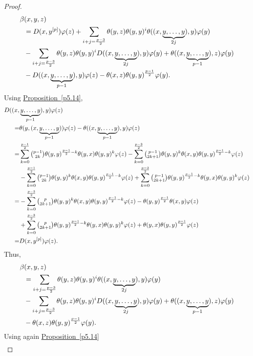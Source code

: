 \documentclass[11pt, twoside]{article}
\begin{document}
\begin{proof}
\begin{align}
        \beta&(x,y,z) \notag \\ &= D(x,y^{[p]})\varphi(z)+ \sum\limits_{i+j=\frac{p-3}{2}}\theta(y,z)\theta(y,y)^i\theta((x,\underbrace{y,\ldots,y}_{2j}),y)\varphi(y) \notag \\ &- \sum\limits_{i+j=\frac{p-3}{2}}\theta(y,z)\theta(y,y)^iD((x,\underbrace{y,\ldots,y}_{2j}),y)\varphi(y) + \theta((x,\underbrace{y,\ldots,y}_{p-1}),z)\varphi(y) \notag\\ &-D((x,\underbrace{y,\ldots,y}_{p-1}),y)\varphi(z) -\theta(x,z)\theta(y,y)^\frac{p-1}{2}\varphi(y) \notag.
    \end{align} Using \hyperref[p5.14]{Proposition~\ref*{p5.14}}, \begin{align*}
        D((x,&\underbrace{y,\ldots,y}_{p-1}),y)\varphi(z)\\ =& \theta(y,(x,\underbrace{y,\ldots,y}_{p-1}))\varphi(z)-\theta((x,\underbrace{y,\ldots,y}_{p-1}),y)\varphi(z)\\ =& \sum\limits_{k=0}^\frac{p-1}{2}\tbinom{p-1}{2k}\theta(y,y)^{\frac{p-1}{2}-k}\theta(y,x)\theta(y,y)^{k}\varphi(z) - \sum\limits_{k=0}^\frac{p-3}{2}\tbinom{p-1}{2k+1}\theta(y,y)^k\theta(x,y)\theta(y,y)^{\frac{p-1}{2}-k}\varphi(z)\\ & -\sum\limits_{k=0}^\frac{p-1}{2}\tbinom{p-1}{2k}\theta(y,y)^k\theta(x,y)\theta(y,y)^{\frac{p-1}{2}-k}\varphi(z)+\sum\limits_{k=0}^\frac{p-3}{2}\tbinom{p-1}{2k+1}\theta(y,y)^{\frac{p-1}{2}-k}\theta(y,x)\theta(y,y)^k\varphi(z)\\ =& -\sum\limits_{k=0}^\frac{p-3}{2}\tbinom{p}{2k+1}\theta(y,y)^k\theta(x,y)\theta(y,y)^{\frac{p-1}{2}-k}\varphi(z) -\theta(y,y)^\frac{p-1}{2}\theta(x,y)\varphi(z) \\ &+ \sum\limits_{k=0}^\frac{p-3}{2}\tbinom{p}{2k+1}\theta(y,y)^{\frac{p-1}{2}-k}\theta(y,x)\theta(y,y)^k\varphi(z)+ \theta(y,x)\theta(y,y)^\frac{p-1}{2}\varphi(z) \\ =& D(x,y^{[p]})\varphi(z).
    \end{align*} Thus, \begin{align}
        \beta&(x,y,z) \notag \\ &=  \sum\limits_{i+j=\frac{p-3}{2}}\theta(y,z)\theta(y,y)^i\theta((x,\underbrace{y,\ldots,y}_{2j}),y)\varphi(y) \notag \\ &- \sum\limits_{i+j=\frac{p-3}{2}}\theta(y,z)\theta(y,y)^iD((x,\underbrace{y,\ldots,y}_{2j}),y)\varphi(y) + \theta((x,\underbrace{y,\ldots,y}_{p-1}),z)\varphi(y) \notag\\ & -\theta(x,z)\theta(y,y)^\frac{p-1}{2}\varphi(y) \notag.
    \end{align} Using again \hyperref[p5.14]{Proposition~\ref*{p5.14}} \begin{align}

\end{align}
\end{proof}
\end{document}
